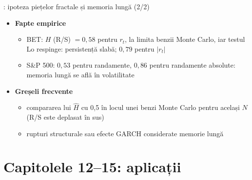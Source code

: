 \begin{frame}{: ipoteza piețelor fractale și memoria lungă (2/2)}
\itemsize{\small}
\begin{itemize}
    \item \textbf{Fapte empirice}
    \begin{itemize}
        \item BET: $H$ (R/S) $= 0{,}58$ pentru $r_t$, la limita benzii Monte Carlo, iar testul Lo respinge: persistență slabă; $0{,}79$ pentru $|r_t|$
        \item S\&P 500: $0{,}53$ pentru randamente, $0{,}86$ pentru randamente absolute: memoria lungă se află în volatilitate
    \end{itemize}
    \item \textbf{Greșeli frecvente}
    \begin{itemize}
        \item compararea lui $\hat H$ cu 0,5 în locul unei benzi Monte Carlo pentru același $N$ (R/S este deplasat în sus)
        \item rupturi structurale sau efecte GARCH considerate memorie lungă
    \end{itemize}
\end{itemize}
\end{frame}


\section{Capitolele 12--15: aplicații}

